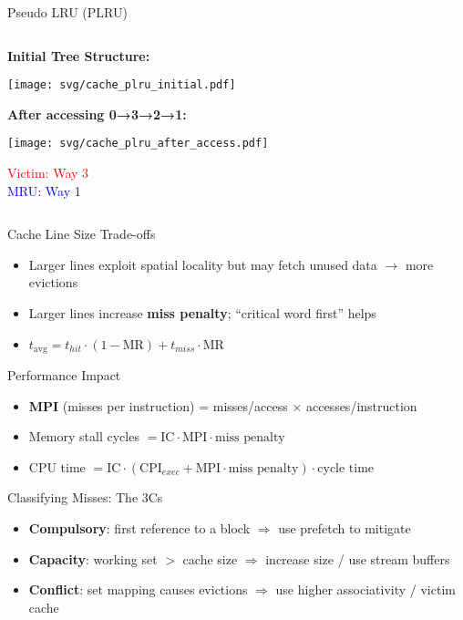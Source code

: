 \documentclass[aspectratio=169,12pt]{beamer}
\begin{document}
\begin{frame}{Pseudo LRU (PLRU)}
\begin{columns}
\begin{column}{0.4\textwidth}
\centering
\vspace{-0.5cm}

\textbf{Initial Tree Structure:}

\texttt{[image: svg/cache\_plru\_initial.pdf]}

\vspace{0.3cm}

\textbf{After accessing 0→3→2→1:}

\texttt{[image: svg/cache\_plru\_after\_access.pdf]}

\vspace{0.2cm}
\small
\textcolor{red}{Victim: Way 3} \\
\textcolor{blue}{MRU: Way 1}
\end{column}
\end{columns}
\end{frame}

\begin{frame}{Cache Line Size Trade-offs}
\begin{itemize}
  \item Larger lines exploit spatial locality but may fetch unused data $\rightarrow$ more evictions
  \item Larger lines increase \textbf{miss penalty}; ``critical word first'' helps
  \item $t_{\text{avg}} = t_{hit}\cdot(1-\text{MR}) + t_{miss}\cdot \text{MR}$
\end{itemize}
\end{frame}

\begin{frame}{Performance Impact}
\begin{itemize}
  \item \textbf{MPI} (misses per instruction) = misses/access $\times$ accesses/instruction
  \item Memory stall cycles $= \text{IC}\cdot \text{MPI}\cdot \text{miss penalty}$
  \item CPU time $= \text{IC}\cdot(\text{CPI}_{exec}+\text{MPI}\cdot \text{miss penalty})\cdot \text{cycle time}$
\end{itemize}
\end{frame}

\begin{frame}{Classifying Misses: The 3Cs}
\begin{itemize}
  \item \textbf{Compulsory}: first reference to a block $\Rightarrow$ use prefetch to mitigate
  \item \textbf{Capacity}: working set $>$ cache size $\Rightarrow$ increase size / use stream buffers
  \item \textbf{Conflict}: set mapping causes evictions $\Rightarrow$ use higher associativity / victim cache
\end{itemize}
\end{frame}
\end{document}
